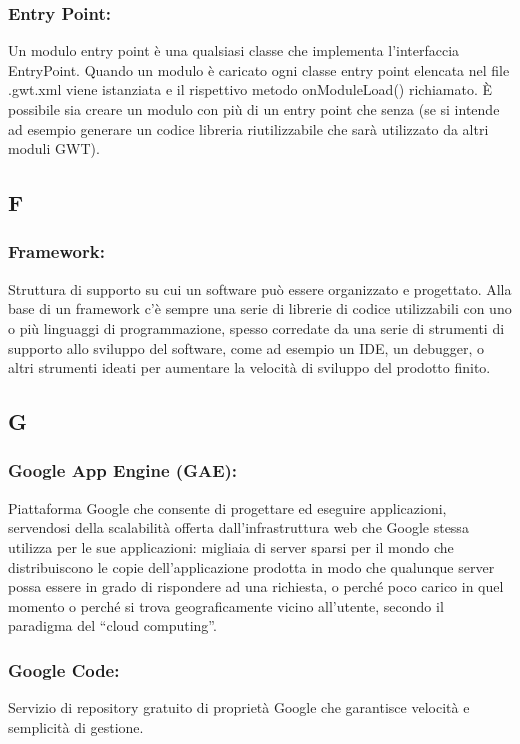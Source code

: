 \subsubsection*{Entry Point:}
Un modulo entry point \`e una qualsiasi classe che implementa l'interfaccia
EntryPoint. Quando un modulo \`e caricato ogni classe entry point elencata nel
file .gwt.xml viene istanziata e il rispettivo metodo onModuleLoad() richiamato.
\`E possibile sia creare un modulo con pi\`u di un entry point che senza (se si
intende ad esempio generare un codice libreria riutilizzabile che sar\`a
utilizzato da altri moduli GWT).

\subsection*{\huge{F}}
\subsubsection*{Framework:}  Struttura di supporto su cui un software pu\`o
essere organizzato e progettato. Alla base di un framework c'\`e sempre una
serie di librerie di codice utilizzabili con uno o pi\`u linguaggi di
programmazione, spesso corredate da una serie di strumenti di supporto allo
sviluppo del software, come ad esempio un IDE, un debugger, o altri strumenti
ideati per aumentare la velocit\`a di sviluppo del prodotto finito.

\subsection*{\huge{G}}

\subsubsection*{Google App Engine (GAE):} Piattaforma Google che consente di
progettare ed eseguire applicazioni, servendosi della scalabilit\`a offerta
dall'infrastruttura web che Google stessa utilizza per le sue applicazioni:
migliaia di server sparsi per il mondo che distribuiscono le copie
dell'applicazione prodotta in modo che qualunque server possa essere in grado di
rispondere ad una richiesta, o perch\'e poco carico in quel momento o perch\'e
si trova geograficamente vicino all'utente, secondo il paradigma del ``cloud computing''.

\subsubsection*{Google Code:} Servizio di repository gratuito di
propriet\`a Google che garantisce velocit\`a e semplicit\`a di gestione.

